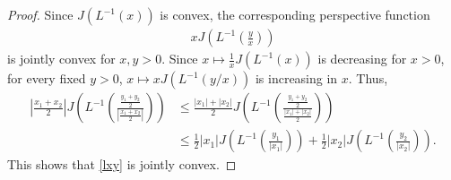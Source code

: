 \documentclass[conference,letterpaper,onecolumn]{IEEEtran}
\theoremstyle{plain}%
\begin{document}
\begin{proof}
    Since $J(L^{-1}(x))$ is convex, the corresponding perspective function
\begin{align}
    xJ\left(L^{-1}\left(\frac{y}{x}\right)\right)
\end{align}
is jointly convex for $x,y>0$. Since $x\mapsto \frac{1}{x}J(L^{-1}(x))$ is  decreasing for $x>0$, for every fixed $y>0$, $x\mapsto xJ(L^{-1}(y/x))$ is  increasing in $x$. Thus, 
\begin{align*}
    \left|\frac{x_1+x_2}{2}\right|J\left(L^{-1}\left(\frac{\frac{y_1+y_2}{2}}{\left|\frac{x_1+x_2}{2}\right|}\right)\right)&\leq \frac{|x_1|+|x_2|}{2}J\left(L^{-1}\left(\frac{\frac{y_1+y_2}{2}}{\frac{|x_1|+|x_2|}{2}}\right)\right)
    \\&\leq \frac12|x_1|J\left(L^{-1}\left(\frac{y_1}{|x_1|}\right)\right)+\frac12|x_2|J\left(L^{-1}\left(\frac{y_2}{|x_2|}\right)\right).
\end{align*}
    This shows that \eqref{lxy} is jointly convex.
\end{proof}


\end{document}
